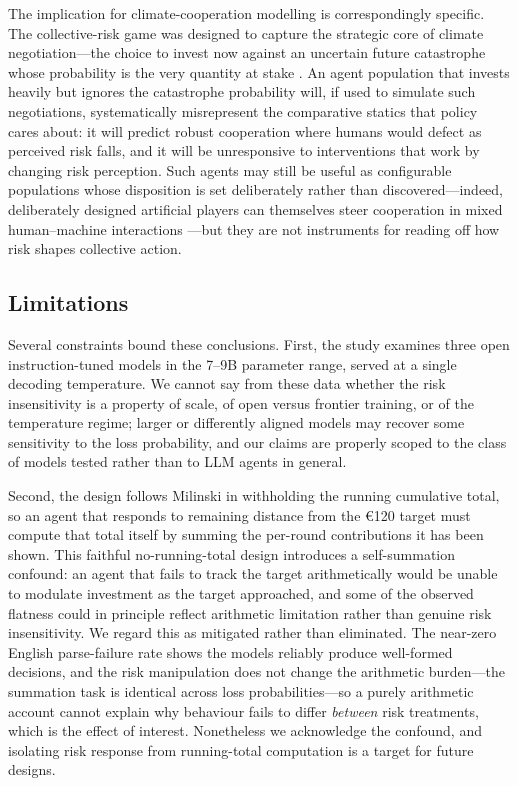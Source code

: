 \documentclass[openacc]{rsproca_new}
\begin{document}
The implication for climate-cooperation modelling is correspondingly specific. The collective-risk game was designed to capture the strategic core of climate negotiation---the choice to invest now against an uncertain future catastrophe whose probability is the very quantity at stake \cite{milinski2008climate}. An agent population that invests heavily but ignores the catastrophe probability will, if used to simulate such negotiations, systematically misrepresent the comparative statics that policy cares about: it will predict robust cooperation where humans would defect as perceived risk falls, and it will be unresponsive to interventions that work by changing risk perception. Such agents may still be useful as configurable populations whose disposition is set deliberately rather than discovered---indeed, deliberately designed artificial players can themselves steer cooperation in mixed human--machine interactions \cite{zimmaro2024discriminatory}---but they are not instruments for reading off how risk shapes collective action.

\subsection{Limitations}

Several constraints bound these conclusions. First, the study examines three open instruction-tuned models in the 7--9B parameter range, served at a single decoding temperature. We cannot say from these data whether the risk insensitivity is a property of scale, of open versus frontier training, or of the temperature regime; larger or differently aligned models may recover some sensitivity to the loss probability, and our claims are properly scoped to the class of models tested rather than to LLM agents in general.

Second, the design follows Milinski in withholding the running cumulative total, so an agent that responds to remaining distance from the €120 target must compute that total itself by summing the per-round contributions it has been shown. This faithful no-running-total design introduces a self-summation confound: an agent that fails to track the target arithmetically would be unable to modulate investment as the target approached, and some of the observed flatness could in principle reflect arithmetic limitation rather than genuine risk insensitivity. We regard this as mitigated rather than eliminated. The near-zero English parse-failure rate shows the models reliably produce well-formed decisions, and the risk manipulation does not change the arithmetic burden---the summation task is identical across loss probabilities---so a purely arithmetic account cannot explain why behaviour fails to differ \emph{between} risk treatments, which is the effect of interest. Nonetheless we acknowledge the confound, and isolating risk response from running-total computation is a target for future designs.
\end{document}
